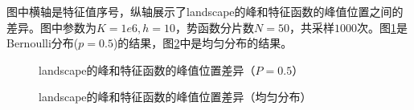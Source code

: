 \documentclass[12pt,a4paper]{article}
\begin{document}
图中横轴是特征值序号，纵轴展示了landscape的峰和特征函数的峰值位置之间的差异。图中参数为$K=1e6, h=10$，势函数分片数$N=50$，共采样$1000$次。图\ref{ml1}是Bernoulli分布($p=0.5$)的结果，图\ref{ml2}中是均匀分布的结果。
\begin{figure}[h]
\centering
{}
\caption{landscape的峰和特征函数的峰值位置差异（$P=0.5$）}
\label{ml1}
\end{figure}
\begin{figure}[h]
\centering
{}
\caption{landscape的峰和特征函数的峰值位置差异（均匀分布）}
\label{ml2}
\end{figure}
\end{document}
